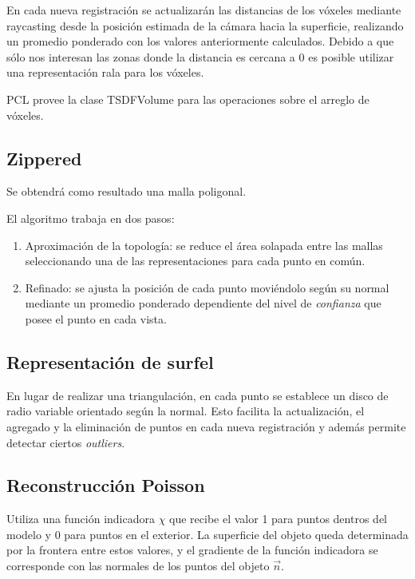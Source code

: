 \documentclass{pfc}
\begin{document}
		En cada nueva registración se actualizarán las distancias de los
		vóxeles mediante raycasting
		desde la posición estimada de la cámara hacia la superficie,
		realizando un promedio ponderado con los valores anteriormente calculados.
		Debido a que sólo nos interesan las zonas donde la distancia es cercana a 0 es posible utilizar una representación rala para los vóxeles.

		PCL provee la clase TSDFVolume para las operaciones sobre el arreglo de vóxeles.

		\subsection{Zippered}
		Se obtendrá como resultado una malla poligonal.

		El algoritmo trabaja en dos pasos:
		\begin{enumerate}
			\item Aproximación de la topología: se reduce el área solapada
				entre las mallas seleccionando una de las representaciones para
				cada punto en común.
			\item Refinado: se ajusta la posición de cada punto moviéndolo
				según su normal mediante un promedio ponderado dependiente del
				nivel de \emph{confianza} que posee el punto en cada vista.
		\end{enumerate}

		\subsection{Representación de surfel}
		En lugar de realizar una triangulación, en cada punto se establece un disco de radio variable orientado según la normal.
		Esto facilita la actualización, el agregado y la eliminación de puntos en cada nueva registración y además permite detectar ciertos \emph{outliers}.

		\subsection{Reconstrucción Poisson}
		Utiliza una función indicadora $\chi$ que recibe el valor 1 para puntos
		dentros del modelo y 0 para puntos en el exterior.
		La superficie del objeto queda determinada por la frontera entre estos
		valores, y el gradiente de la función indicadora se corresponde con las
		normales de los puntos del objeto $\vec{n}$.
\end{document}
